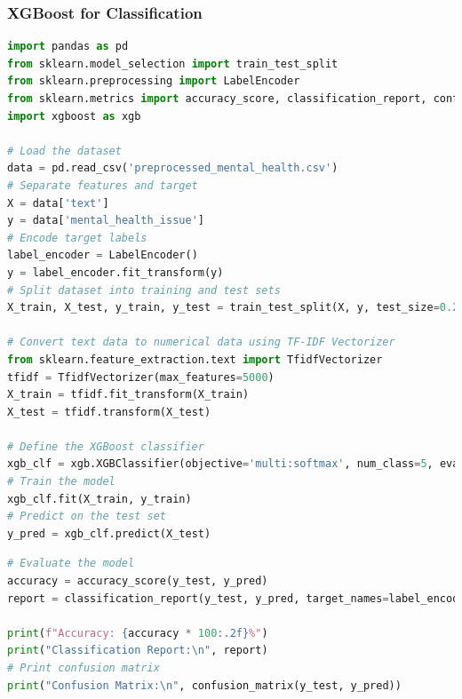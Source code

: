 
\subsubsection{XGBoost for Classification}

\begin{tcolorbox}[colback=gray!5!white, colframe=gray!80!black, boxrule=0.5pt, title=XGBoost Classifier Implementation]
    \begin{lstlisting}[language=Python]
import pandas as pd
from sklearn.model_selection import train_test_split
from sklearn.preprocessing import LabelEncoder
from sklearn.metrics import accuracy_score, classification_report, confusion_matrix
import xgboost as xgb

# Load the dataset
data = pd.read_csv('preprocessed_mental_health.csv')
# Separate features and target
X = data['text']
y = data['mental_health_issue']
# Encode target labels
label_encoder = LabelEncoder()
y = label_encoder.fit_transform(y)
# Split dataset into training and test sets
X_train, X_test, y_train, y_test = train_test_split(X, y, test_size=0.2, random_state=42)

# Convert text data to numerical data using TF-IDF Vectorizer
from sklearn.feature_extraction.text import TfidfVectorizer
tfidf = TfidfVectorizer(max_features=5000)
X_train = tfidf.fit_transform(X_train)
X_test = tfidf.transform(X_test)

# Define the XGBoost classifier
xgb_clf = xgb.XGBClassifier(objective='multi:softmax', num_class=5, eval_metric='mlogloss', use_label_encoder=False)
# Train the model
xgb_clf.fit(X_train, y_train)
# Predict on the test set
y_pred = xgb_clf.predict(X_test)
\end{lstlisting}
\end{tcolorbox}

\begin{tcolorbox}[colback=gray!5!white, colframe=gray!80!black, boxrule=0.5pt, title=XGBoost Classifier Implementation]
    \begin{lstlisting}[language=Python]
# Evaluate the model
accuracy = accuracy_score(y_test, y_pred)
report = classification_report(y_test, y_pred, target_names=label_encoder.classes_)

print(f"Accuracy: {accuracy * 100:.2f}%")
print("Classification Report:\n", report)
# Print confusion matrix
print("Confusion Matrix:\n", confusion_matrix(y_test, y_pred))
    \end{lstlisting}
\end{tcolorbox}

